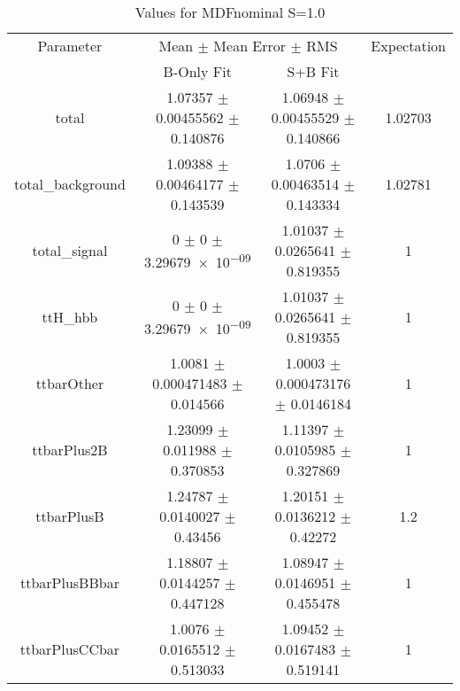 \begin{table}
\centering
\caption{Values for MDFnominal S=1.0}
\begin{tabular}{cccc}
\toprule
Parameter & \multicolumn{2}{c}{Mean $\pm$ Mean Error $\pm$ RMS} & Expectation\\
 & B-Only Fit & S+B Fit & \\
\midrule
total & \num{1.07357} $\pm$ \num{0.00455562} $\pm$ \num{0.140876} & \num{1.06948} $\pm$ \num{0.00455529} $\pm$ \num{0.140866} & \num{1.02703}\\
total\_background & \num{1.09388} $\pm$ \num{0.00464177} $\pm$ \num{0.143539} & \num{1.0706} $\pm$ \num{0.00463514} $\pm$ \num{0.143334} & \num{1.02781}\\
total\_signal & \num{0} $\pm$ \num{0} $\pm$ \num{3.29679e-09} & \num{1.01037} $\pm$ \num{0.0265641} $\pm$ \num{0.819355} & \num{1}\\
ttH\_hbb & \num{0} $\pm$ \num{0} $\pm$ \num{3.29679e-09} & \num{1.01037} $\pm$ \num{0.0265641} $\pm$ \num{0.819355} & \num{1}\\
ttbarOther & \num{1.0081} $\pm$ \num{0.000471483} $\pm$ \num{0.014566} & \num{1.0003} $\pm$ \num{0.000473176} $\pm$ \num{0.0146184} & \num{1}\\
ttbarPlus2B & \num{1.23099} $\pm$ \num{0.011988} $\pm$ \num{0.370853} & \num{1.11397} $\pm$ \num{0.0105985} $\pm$ \num{0.327869} & \num{1}\\
ttbarPlusB & \num{1.24787} $\pm$ \num{0.0140027} $\pm$ \num{0.43456} & \num{1.20151} $\pm$ \num{0.0136212} $\pm$ \num{0.42272} & \num{1.2}\\
ttbarPlusBBbar & \num{1.18807} $\pm$ \num{0.0144257} $\pm$ \num{0.447128} & \num{1.08947} $\pm$ \num{0.0146951} $\pm$ \num{0.455478} & \num{1}\\
ttbarPlusCCbar & \num{1.0076} $\pm$ \num{0.0165512} $\pm$ \num{0.513033} & \num{1.09452} $\pm$ \num{0.0167483} $\pm$ \num{0.519141} & \num{1}\\
\bottomrule
\end{tabular}
\end{table}